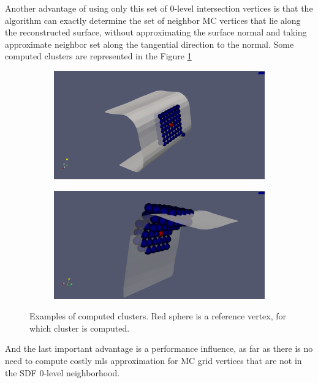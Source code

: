 Another advantage of using only this set of 0-level intersection vertices is that the algorithm can exactly determine the set of neighbor MC vertices that lie along the reconstructed surface, without approximating the surface normal and taking approximate neighbor set along the tangential direction to the normal. Some computed clusters are represented in the Figure \ref{fig:clusters}\\
\begin{figure}[H]
	\begin{center}
		\begin{subfigure}[b]{0.45\textwidth}
			\includegraphics[width=\textwidth]{figures/MlsCluster.png}
		\end{subfigure}
		\begin{subfigure}[b]{0.45\textwidth}
			\includegraphics[width=\textwidth]{figures/MlsCluster2.png}
		\end{subfigure}
	\end{center}
	\caption{Examples of computed clusters. Red sphere is a reference vertex, for which cluster is computed.}
	\label{fig:clusters}
\end{figure}

And the last important advantage is a performance influence, as far as there is no need to compute costly mls approximation for MC grid vertices that are not in the SDF 0-level neighborhood.\\

